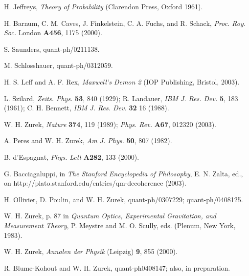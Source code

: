 \documentclass[aps,pra,epsfig,11pt,floatfix]{revtex4}
\begin{document}
\noindent[50] H. Jeffreys, {\it Theory of Probability} 
(Clarendon Press, Oxford 1961).

\noindent[51] H. Barnum, C. M. Caves, J. Finkelstein, C. A. Fuchs, and 
R. Schack, {\it Proc. Roy. Soc.} London {\bf A456}, 1175 (2000).
 
\noindent[52] S. Saunders, quant-ph/0211138.

\noindent[53] M. Schlosshauer, quant-ph/0312059.

\noindent[54] H. S. Leff and A. F. Rex, {\it Maxwell's Demon 2} 
(IOP Publishing, Bristol, 2003).

\noindent[55] L. Szilard, {\it Zeits. Phys.} {\bf 53}, 840 (1929);
R. Landauer, {\it IBM J. Res. Dev.} {\bf 5}, 183 (1961);
C. H. Bennett, {\it IBM J. Res. Dev.} {\bf 32} 16 (1988). 

\noindent[56] W. H. Zurek,  {\it Nature} {\bf 374}, 119 (1989);
{\it Phys. Rev.} {\bf A67}, 012320 (2003).

\noindent[57] A. Peres and W. H. Zurek, {\it Am J. Phys.} {\bf 50}, 807 (1982).

\noindent[58] B. d'Espagnat, {\it Phys. Lett} {\bf A282}, 133 (2000).

\noindent[59] G. Bacciagaluppi, in {\it The Stanford Encyclopedia 
of Philosophy}, E. N. Zalta, ed., 
on http://plato.stanford.edu/entries/qm-decoherence (2003).

\noindent[60] H. Ollivier, D. Poulin, and W. H. Zurek, quant-ph/0307229;
quant-ph/0408125.

\noindent[61] W. H. Zurek, p. 87 in {\it Quantum Optics, Experimental 
Gravitation, and Measurement Theory}, P. Meystre and M. O. Scully, eds.
(Plenum, New York, 1983).

\noindent[62] W. H. Zurek, {\it Annalen der Physik} 
(Leipzig) {\bf 9}, 855 (2000).

\noindent[63] R. Blume-Kohout and W. H. Zurek, quant-ph0408147; also, 
in preparation. 
\end{document}
